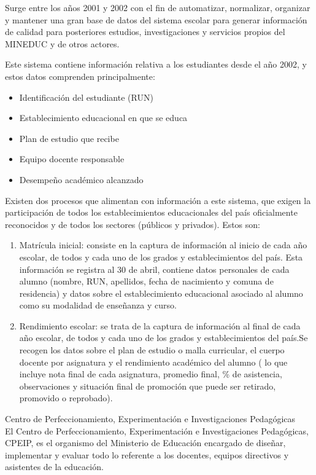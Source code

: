 \begin{longdescription}
    Surge entre los años 2001 y 2002 con el fin de automatizar, normalizar, organizar y mantener una gran base de datos del sistema escolar para generar información de calidad para posteriores estudios, investigaciones y servicios propios del MINEDUC y de otros actores.
    
    Este sistema contiene información relativa a los estudiantes desde el año 2002, y estos datos comprenden principalmente: 
    \begin{itemize}
        \item Identificación del estudiante (RUN)
        \item Establecimiento educacional en que se educa
        \item Plan de estudio que recibe
        \item Equipo docente responsable
        \item Desempeño académico alcanzado
    \end{itemize}
    Existen dos procesos que alimentan con información a este sistema, que exigen la participación de todos los establecimientos educacionales del país oficialmente reconocidos y de todos los sectores (públicos y privados). Estos son:
    \begin{enumerate}
        \item Matrícula inicial: consiste en la captura de información al inicio de cada año escolar, de todos y cada uno de los grados y establecimientos del país. Esta información se registra al 30 de abril, contiene datos personales de cada alumno (nombre, RUN, apellidos, fecha de nacimiento y comuna de residencia) y datos sobre el establecimiento educacional asociado al alumno como su modalidad de enseñanza y curso.
        \item Rendimiento escolar: se trata de la captura de información al final de cada año escolar, de todos y cada uno de los grados y establecimientos del país.Se recogen los datos sobre el plan de estudio o malla curricular, el cuerpo docente por asignatura y el rendimiento académico del alumno ( lo que incluye nota final de cada asignatura, promedio final, \% de asistencia, observaciones y situación final de promoción que puede ser retirado, promovido o reprobado).
    \end{enumerate}
\item [Centro de Perfeccionamiento, Experimentación e Investigaciones Pedagógicas] \hfill \\
    El Centro de Perfeccionamiento, Experimentación e Investigaciones Pedagógicas, CPEIP, es el organismo del Ministerio de Educación encargado de diseñar, implementar y evaluar todo lo referente a los docentes, equipos directivos y asistentes de la educación.
    

\end{longdescription}
